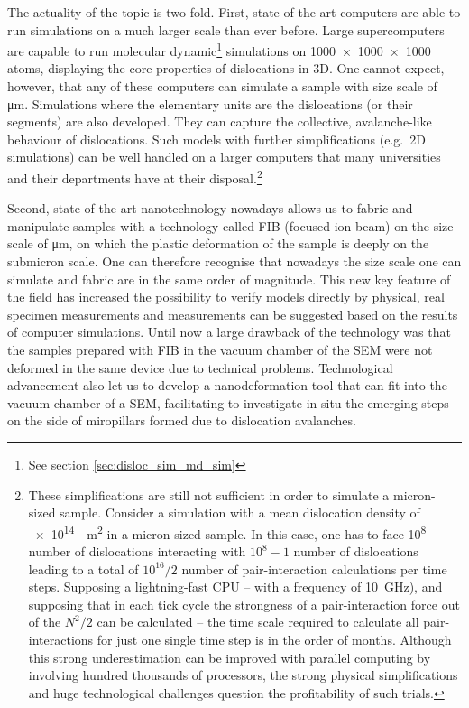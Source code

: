 The actuality of the topic is two-fold. First, state-of-the-art computers are able to run simulations on a much larger scale than ever before. Large supercomputers are capable to run molecular dynamic\footnote{See section \ref{sec:disloc_sim_md_sim}} simulations on \num{1000 x 1000 x 1000} atoms, displaying the core properties of dislocations in 3D. One cannot expect, however, that any of these computers can simulate a sample with size scale of \si{\micro\meter}. Simulations where the elementary units are the dislocations (or their segments) are also developed. They can capture the collective, avalanche-like behaviour of dislocations. Such models with further simplifications (e.g.\ 2D simulations) can be well handled on a larger computers that many universities and their departments have at their disposal.\footnote{These simplifications are still not sufficient in order to simulate a micron-sized sample. Consider a simulation with a mean dislocation density of \SI{e14}{\per m^2} in a micron-sized sample. In this case, one has to face \si{10^8} number of dislocations interacting with $10^8-1$ number of dislocations leading to a total of ${10^{16}}/2$ number of pair-interaction calculations per time steps. Supposing a lightning-fast CPU -- with a frequency of \SI{10}{\GHz}), and supposing that in each tick cycle the strongness of a pair-interaction force out of the $N^2/2$ can be calculated -- the time scale required to calculate all pair-interactions for just one single time step is in the order of months. Although this strong underestimation can be improved with parallel computing by involving hundred thousands of processors, the strong physical simplifications and huge technological challenges question the profitability of such trials.}

Second, state-of-the-art nanotechnology nowadays allows us to fabric and manipulate samples with a technology called FIB (focused ion beam) on the size scale of \si{\micro\meter}, on which the plastic deformation of the sample is deeply on the submicron scale. One can therefore recognise that nowadays the size scale one can simulate and fabric are in the same order of magnitude. This new key feature of the field has increased the possibility to verify models directly by physical, real specimen measurements and measurements can be suggested based on the results of computer simulations. Until now a large drawback of the technology was that the samples prepared with FIB in the vacuum chamber of the SEM were not deformed in the same device due to technical problems. Technological advancement also let us to develop a nanodeformation tool that can fit into the vacuum chamber of a SEM, facilitating to investigate in situ the emerging steps on the side of miropillars formed due to dislocation avalanches.

